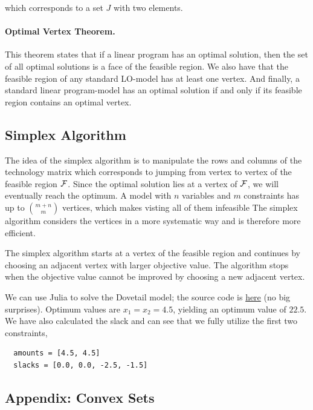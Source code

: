 which corresponds to a set $J$ with two elements.


\paragraph{Optimal Vertex Theorem.} This theorem states that if a linear program has an optimal solution, then the set of all optimal solutions is a face of the feasible region. We also have that the feasible region of any standard LO-model has at least one vertex. And finally, a standard linear program-model has an optimal solution if and only if its feasible region contains an optimal vertex.






\subsection{Simplex Algorithm}

The idea of the simplex algorithm is to manipulate the rows and columns of the technology matrix which corresponds to jumping from vertex to vertex of the feasible region $\mathcal{F}$. Since the optimal solution lies at a vertex of $\mathcal{F}$, we will eventually reach the optimum. A model with $n$ variables and $m$ constraints has up to ${m+n \choose m}$ vertices, which makes visting all of them infeasible The simplex algorithm considers the vertices in a more systematic way and is therefore more efficient. 

The simplex algorithm starts at a vertex of the feasible region and continues by choosing an adjacent vertex with larger objective value. The algorithm stops when the objective value cannot be improved by choosing a new adjacent vertex.

We can use Julia to solve the Dovetail model; the source code is \href{https://github.com/ClemensFMN/JuliaStuff/blob/master/JuMP/2022-09-27_dovetail_2.jl}{here} (no big surprises). Optimum values are $x_1 = x_2 = 4.5$, yielding an optimum value of $22.5$. We have also calculated the slack and can see that we fully utilize the first two constraints,

\begin{verbatim}
  amounts = [4.5, 4.5]
  slacks = [0.0, 0.0, -2.5, -1.5]
\end{verbatim}

\subsection{Appendix: Convex Sets}

